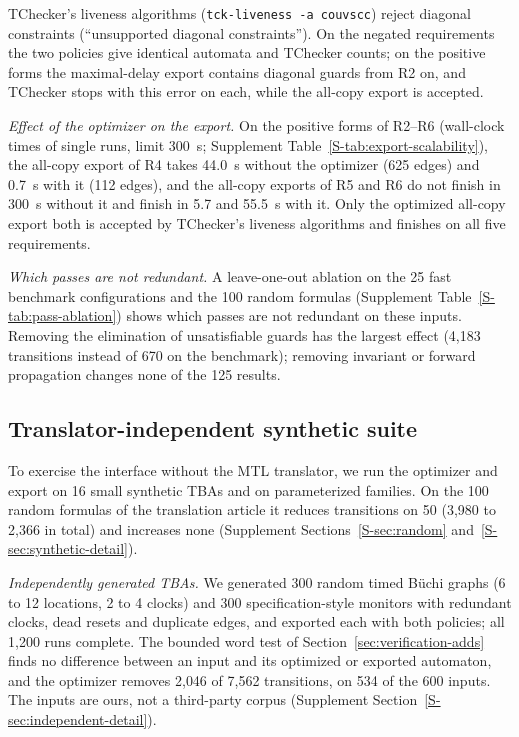   TChecker's liveness algorithms (\texttt{tck-liveness -a couvscc}) reject diagonal constraints (``unsupported diagonal constraints''). On the negated requirements the two policies give identical automata and TChecker counts; on the positive forms the maximal-delay export contains diagonal guards from R2 on, and TChecker stops with this error on each, while the all-copy export is accepted. 

\emph{Effect of the optimizer on the export.}  On the positive forms of R2--R6 (wall-clock times of single runs, limit 300~s; Supplement Table~\ref{S-tab:export-scalability}), the all-copy export of R4 takes 44.0~s without the optimizer (625 edges) and 0.7~s with it (112 edges), and the all-copy exports of R5 and R6 do not finish in 300~s without it and finish in 5.7 and 55.5~s with it. Only the optimized all-copy export both is accepted by TChecker's liveness algorithms and finishes on all five requirements.

\emph{Which passes are not redundant.} A leave-one-out ablation on the 25 fast benchmark configurations and the 100 random formulas (Supplement Table~\ref{S-tab:pass-ablation}) shows which passes are not redundant on these inputs. Removing the elimination of unsatisfiable guards has the largest effect (4{,}183 transitions instead of 670 on the benchmark); removing invariant or forward propagation changes none of the 125 results.

\subsection{Translator-independent synthetic suite}
\label{sec:synthetic}
To exercise the interface without the MTL translator, we run the optimizer and export on 16 small synthetic TBAs and on parameterized families. On the 100 random formulas of the translation article it reduces transitions on 50 (3,980 to 2,366 in total) and increases none (Supplement Sections~\ref{S-sec:random} and~\ref{S-sec:synthetic-detail}).

\emph{Independently generated TBAs.} We generated 300 random timed B\"uchi graphs (6 to 12 locations, 2 to 4 clocks) and 300 specification-style monitors with redundant clocks, dead resets and duplicate edges, and exported each with both policies; all 1{,}200 runs complete. The bounded word test of Section~\ref{sec:verification-adds} finds no difference between an input and its optimized or exported automaton, and the optimizer removes 2{,}046 of 7{,}562 transitions, on 534 of the 600 inputs.  The inputs are ours, not a third-party corpus (Supplement Section~\ref{S-sec:independent-detail}).

